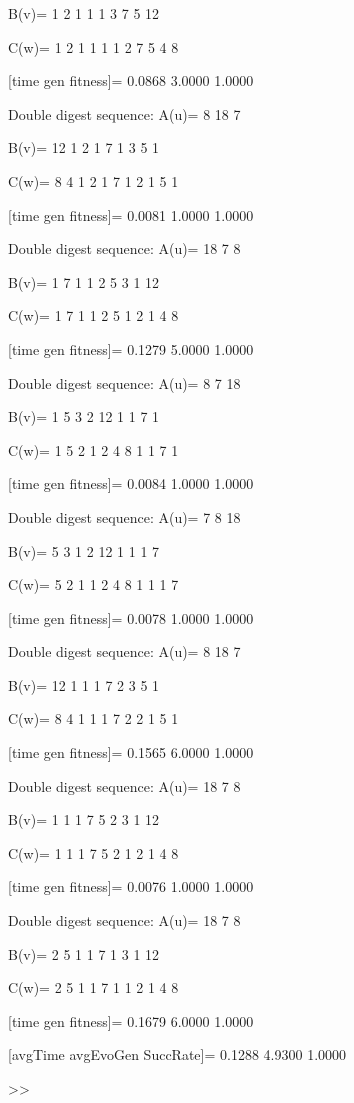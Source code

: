 B(v)=
     1     2     1     1     1     3     7     5    12

C(w)=
     1     2     1     1     1     1     2     7     5     4     8

[time gen fitness]=
    0.0868    3.0000    1.0000

Double digest sequence:
A(u)=
     8    18     7

B(v)=
    12     1     2     1     7     1     3     5     1

C(w)=
     8     4     1     2     1     7     1     2     1     5     1

[time gen fitness]=
    0.0081    1.0000    1.0000

Double digest sequence:
A(u)=
    18     7     8

B(v)=
     1     7     1     1     2     5     3     1    12

C(w)=
     1     7     1     1     2     5     1     2     1     4     8

[time gen fitness]=
    0.1279    5.0000    1.0000

Double digest sequence:
A(u)=
     8     7    18

B(v)=
     1     5     3     2    12     1     1     7     1

C(w)=
     1     5     2     1     2     4     8     1     1     7     1

[time gen fitness]=
    0.0084    1.0000    1.0000

Double digest sequence:
A(u)=
     7     8    18

B(v)=
     5     3     1     2    12     1     1     1     7

C(w)=
     5     2     1     1     2     4     8     1     1     1     7

[time gen fitness]=
    0.0078    1.0000    1.0000

Double digest sequence:
A(u)=
     8    18     7

B(v)=
    12     1     1     1     7     2     3     5     1

C(w)=
     8     4     1     1     1     7     2     2     1     5     1

[time gen fitness]=
    0.1565    6.0000    1.0000

Double digest sequence:
A(u)=
    18     7     8

B(v)=
     1     1     1     7     5     2     3     1    12

C(w)=
     1     1     1     7     5     2     1     2     1     4     8

[time gen fitness]=
    0.0076    1.0000    1.0000

Double digest sequence:
A(u)=
    18     7     8

B(v)=
     2     5     1     1     7     1     3     1    12

C(w)=
     2     5     1     1     7     1     1     2     1     4     8

[time gen fitness]=
    0.1679    6.0000    1.0000

[avgTime  avgEvoGen  SuccRate]=
    0.1288    4.9300    1.0000

>> 